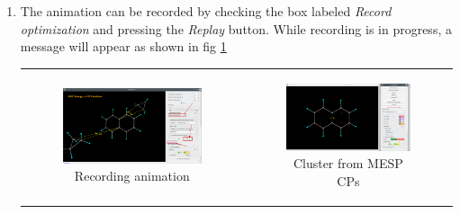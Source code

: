 \documentclass[10pt]{article}
\begin{document}
\begin{enumerate}
\item The animation can be recorded by checking the box labeled
{\it Record optimization} and pressing the {\it Replay} button.
While recording is in progress, a message will appear as
shown in fig \ref{fig:A6_7}

\begin{center}
\begin{tabular}{cc}
\begin{minipage}{.48\linewidth}
\begin{figure}[H]
\begin{center}
\includegraphics[width=.8\linewidth]{damqt320_epic_7_b.png}
\end{center}
\caption{{Recording animation} \label{fig:A6_7}}
\end{figure}
\end{minipage}
&
\begin{minipage}{.48\linewidth}
\begin{figure}[H]
\begin{center}
\includegraphics[width=.8\linewidth]{damqt320_epic_8.png}
\end{center}
\caption{{Cluster from MESP CPs}\label{fig:A6_8}}
\end{figure}
\end{minipage}
\end{tabular}
\end{center}


\end{enumerate}
\end{document}
